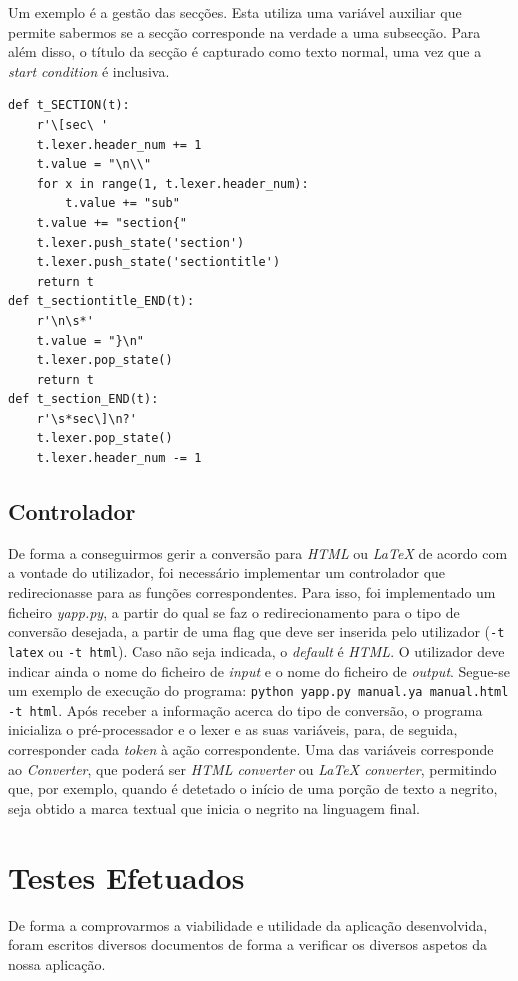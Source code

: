 \documentclass{article}
\begin{document}
 Um exemplo é a gestão das secções. Esta utiliza uma variável auxiliar que permite sabermos se a secção corresponde na verdade a uma subsecção. Para além disso, o título da secção é capturado como texto normal, uma vez que a \textit{start condition} é inclusiva.\\
 \begin{verbatim}
def t_SECTION(t):
    r'\[sec\ '
    t.lexer.header_num += 1
    t.value = "\n\\"
    for x in range(1, t.lexer.header_num):
        t.value += "sub"
    t.value += "section{"
    t.lexer.push_state('section')
    t.lexer.push_state('sectiontitle')
    return t
def t_sectiontitle_END(t):
    r'\n\s*'
    t.value = "}\n"
    t.lexer.pop_state()
    return t
def t_section_END(t):
    r'\s*sec\]\n?'
    t.lexer.pop_state()
    t.lexer.header_num -= 1
\end{verbatim}
 \subsection{Controlador}
De forma a conseguirmos gerir a conversão para \textit{HTML} ou \textit{LaTeX} de acordo com a vontade do utilizador, foi necessário implementar um controlador que redirecionasse para as funções correspondentes. Para isso, foi implementado um ficheiro \textit{yapp.py}, a partir do qual se faz o redirecionamento para o tipo de conversão desejada, a partir de uma flag que deve ser inserida pelo utilizador (\texttt{-t latex} ou \texttt{-t html}). Caso não seja indicada, o \textit{default} é \textit{HTML}. O utilizador deve indicar ainda o nome do ficheiro de \textit{input} e o nome do ficheiro de \textit{output}. Segue-se um exemplo de execução do programa: \texttt{python yapp.py manual.ya manual.html -t html}. Após receber a informação acerca do tipo de conversão, o programa inicializa o pré-processador e o lexer e as suas variáveis, para, de seguida, corresponder cada \textit{token} à ação correspondente. Uma das variáveis corresponde ao \textit{Converter}, que poderá ser \textit{HTML converter} ou \textit{LaTeX converter}, permitindo que, por exemplo, quando é detetado o início de uma porção de texto a negrito, seja obtido a marca textual que inicia o negrito na linguagem final.\section{Testes Efetuados}
De forma a comprovarmos a viabilidade e utilidade da aplicação desenvolvida, foram escritos diversos documentos de forma a verificar os diversos aspetos da nossa aplicação.\\
\end{document}
